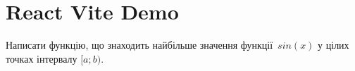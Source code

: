 \documentclass[12pt]{article}
\begin{document}
\section*{React Vite Demo}

Написати функцію, що знаходить найбільше значення функції~$sin(x)$ у цілих точках інтервалу $[a; b)$.


\end{document}
